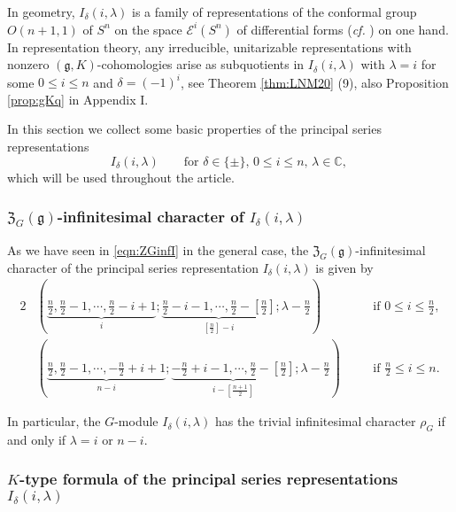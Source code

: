 In geometry, 
 $I_{\delta}(i,\lambda)$ is a family of representations
 of the conformal group $O(n+1,1)$ 
 of $S^n$ on the space ${\mathcal{E}}^i(S^n)$
 of differential forms
 ({\it{cf.}} \cite[Chap.~2, Sect.~2]{KKP})
 on one hand.  
In representation theory,
 any irreducible, unitarizable representations
 with nonzero $({\mathfrak{g}}, K)$-cohomologies arise
 as subquotients
 in $I_{\delta}(i,\lambda)$ with $\lambda=i$
 for some $0 \le i \le n$
 and $\delta=(-1)^i$, 
 see Theorem \ref{thm:LNM20} (9), 
 also Proposition \ref{prop:gKq} in Appendix I. 



In this section we collect some basic properties
 of the principal series representations
\[
  I_{\delta}(i,\lambda)
\qquad
  \text{for $\delta \in \{\pm\}$, $0 \le i \le n$, $\lambda \in {\mathbb{C}}$, }
\]
which will be used throughout the article.  

\subsubsection{${\mathfrak{Z}}_G({\mathfrak{g}})$-infinitesimal character of $I_{\delta}(i,\lambda)$}



As we have seen in \eqref{eqn:ZGinfI} in the general case, 
the 
 ${\mathfrak{Z}}_G({\mathfrak{g}})$-infinitesimal character
 of the principal series representation $I_{\delta}(i,\lambda)$ is given by 
\begin{alignat*}{2}
&(\underbrace{\frac n 2, \frac n 2-1, \cdots, \frac n 2-i+1}_i; 
  \underbrace{\frac n 2-i-1, \cdots, \frac n 2-[\frac n 2]}_{[\frac n 2]-i}; \lambda-\frac n 2)
\quad
&&\text{if }
0 \le i \le \frac n 2, 
\\
&(\underbrace{\frac n 2, \frac n 2-1, \cdots, -\frac n 2+i+1}_{n-i}; 
  \underbrace{-\frac n 2+i-1, \cdots, \frac n 2-[\frac n 2]}_{i-[\frac {n+1} 2]}; \lambda-\frac n 2)
\quad
&&\text{if }
\frac n 2 \le i \le n.  
\end{alignat*}



In particular,
 the $G$-module $I_{\delta}(i,\lambda)$ has the trivial infinitesimal character $\rho_G$
 if and only if $\lambda=i$ or $n-i$.  


\subsubsection{$K$-type formula of the principal series representations $I_\delta(i,\lambda)$}


